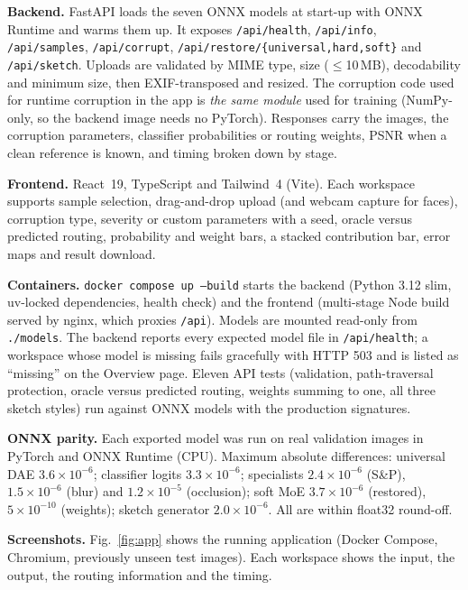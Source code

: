 ﻿\documentclass[conference]{IEEEtran}
\begin{document}
\textbf{Backend.} FastAPI loads the seven ONNX models at start-up with ONNX Runtime and warms them up.
It exposes \texttt{/api/health}, \texttt{/api/info}, \texttt{/api/samples}, \texttt{/api/corrupt},
\texttt{/api/restore/\{universal,hard,soft\}} and \texttt{/api/sketch}. Uploads are validated by MIME
type, size ($\le$10\,MB), decodability and minimum size, then EXIF-transposed and resized. The
corruption code used for runtime corruption in the app is \emph{the same module} used for training
(NumPy-only, so the backend image needs no PyTorch). Responses carry the images, the corruption
parameters, classifier probabilities or routing weights, PSNR when a clean reference is known, and
timing broken down by stage.

\textbf{Frontend.} React~19, TypeScript and Tailwind~4 (Vite). Each workspace supports sample
selection, drag-and-drop upload (and webcam capture for faces), corruption type, severity or custom
parameters with a seed, oracle versus predicted routing, probability and weight bars, a stacked
contribution bar, error maps and result download.

\textbf{Containers.} \texttt{docker compose up --build} starts the backend (Python 3.12 slim, uv-locked
dependencies, health check) and the frontend (multi-stage Node build served by nginx, which proxies
\texttt{/api}). Models are mounted read-only from \texttt{./models}. The backend reports every expected
model file in \texttt{/api/health}; a workspace whose model is missing fails gracefully with HTTP 503
and is listed as ``missing'' on the Overview page. Eleven
API tests (validation, path-traversal protection, oracle versus predicted routing, weights summing to one,
all three sketch styles) run against ONNX models with the production signatures.

\textbf{ONNX parity.} Each exported model was run on real validation images in PyTorch and ONNX
Runtime (CPU). Maximum absolute differences: universal DAE $3.6{\times}10^{-6}$; classifier logits
$3.3{\times}10^{-6}$; specialists $2.4{\times}10^{-6}$ (S\&P), $1.5{\times}10^{-6}$ (blur) and
$1.2{\times}10^{-5}$ (occlusion); soft MoE $3.7{\times}10^{-6}$ (restored), $5{\times}10^{-10}$
(weights); sketch generator $2.0{\times}10^{-6}$. All are within float32 round-off.

\textbf{Screenshots.} Fig.~\ref{fig:app} shows the running application (Docker Compose, Chromium,
previously unseen test images). Each workspace shows the input, the output, the routing information
and the timing.
\end{document}
